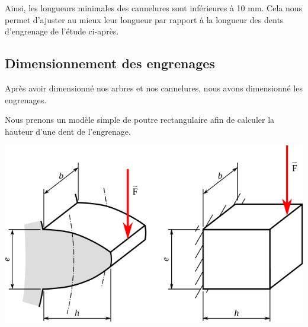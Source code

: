 \documentclass{config}
\begin{document}
\begin{spacing}{1.2}
\begin{table}[h]
\centering
{}
\end{table}

Ainsi, les longueurs minimales des cannelures sont inférieures à 10 mm. Cela nous permet d'ajuster au mieux leur longueur par rapport à la longueur des dents d'engrenage de l'étude ci-après. 

\newpage
\subsection{Dimensionnement des engrenages}

Après avoir dimensionné nos arbres et nos cannelures, nous avons dimensionné les engrenages.

Nous prenons un modèle simple de poutre rectangulaire afin de calculer la hauteur d'une dent de l'engrenage.

\begin{center}
\includegraphics[scale=0.6]{Flexion_dent_engrenage_modele_lewis.png}
\end{center}


\end{spacing}
\end{document}
